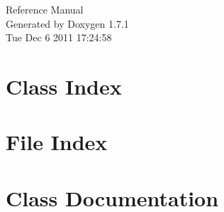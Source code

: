 \documentclass[a4paper]{book}
\begin{document}
\hypersetup{pageanchor=false}
\begin{titlepage}
\vspace*{7cm}
\begin{center}
{\Large Reference Manual}\\
\vspace*{1cm}
{\large Generated by Doxygen 1.7.1}\\
\vspace*{0.5cm}
{\small Tue Dec 6 2011 17:24:58}\\
\end{center}
\end{titlepage}
\clearemptydoublepage
{}
\tableofcontents
\clearemptydoublepage
{}
\hypersetup{pageanchor=true}
\chapter{Class Index}

\chapter{File Index}

\chapter{Class Documentation}






































\end{document}
